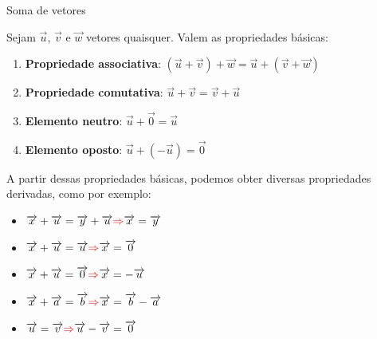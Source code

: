 \begin{frame}{Soma de vetores}

    Sejam \(\vec{u}\), \(\vec{v}\) e \(\vec{w}\) vetores quaisquer. Valem as propriedades básicas:

    \begin{enumerate}
        \item \textbf{Propriedade associativa}:
            \((\vec{u}+\vec{v})+\vec{w}=\vec{u}+(\vec{v}+\vec{w})\)
        \item \textbf{Propriedade comutativa}: \(\vec{u}+\vec{v}=\vec{v}+\vec{u}\)
        \item \textbf{Elemento neutro}: \(\vec{u}+\vec{0}=\vec{u}\)
        \item \textbf{Elemento oposto}: \(\vec{u}+(-\vec{u})=\vec{0}\)
    \end{enumerate}
    \pause
    A partir dessas propriedades básicas, podemos obter diversas propriedades derivadas, como por exemplo:
    \begin{itemize}
        \item \(\vec{x}+\vec{u}=\vec{y}+\vec{u} \textcolor{red}{\Rightarrow} \vec{x}=\vec{y}\)
        \item \(\vec{x}+\vec{u}=\vec{u} \textcolor{red}{\Rightarrow} \vec{x}=\vec{0}\)
        \item \(\vec{x}+\vec{u}=\vec{0} \textcolor{red}{\Rightarrow} \vec{x}=-\vec{u}\)
        \item \(\vec{x}+\vec{a}=\vec{b} \textcolor{red}{\Rightarrow} \vec{x}=\vec{b}-\vec{a}\)
        \item \(\vec{u}=\vec{v} \textcolor{red}{\Rightarrow} \vec{u}-\vec{v}=\vec{0}\)
    \end{itemize}
\end{frame}



